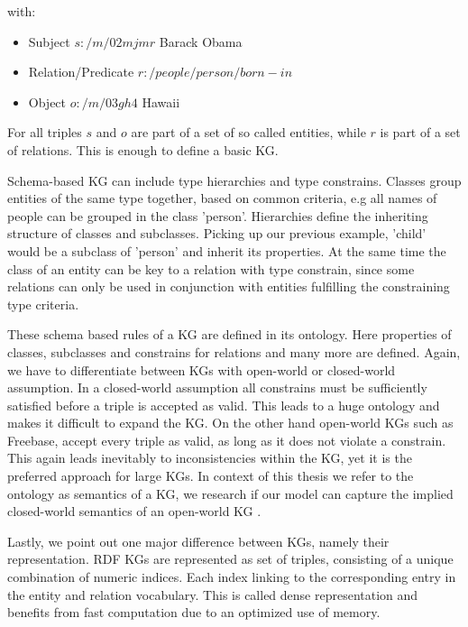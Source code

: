 with:
\begin{itemize}
    \item Subject $s:   /m/02mjmr$ Barack Obama
    \item Relation/Predicate $r:    /people/person/born-in$
    \item Object $o:     /m/03gh4$ Hawaii
\end{itemize}


For all triples $s$ and $o$ are part of a set of so called entities, while $r$ is part of a set of relations. This is enough to define a basic KG.

Schema-based KG can include type hierarchies and type constrains. Classes group entities of the same type together, based on common criteria, e.g all names of people can be grouped in the class 'person'. Hierarchies define the inheriting structure of classes and subclasses. Picking up our previous example, 'child' would be a subclass of 'person' and inherit its properties. At the same time the class of an entity can be key to a relation with type constrain, since some relations can only be used in conjunction with entities fulfilling the constraining type criteria.

These schema based rules of a KG are defined in its ontology. Here properties of classes, subclasses and constrains for relations and many more are defined. Again, we have to differentiate between KGs with open-world or closed-world assumption. In a closed-world assumption all constrains must be sufficiently satisfied before a triple is accepted as valid. This leads to a huge ontology and makes it difficult to expand the KG. On the other hand open-world KGs such as Freebase, accept every triple as valid, as long as it does not violate a constrain. This again leads inevitably to inconsistencies within the KG, yet it is the preferred approach for large KGs. In context of this thesis we refer to the ontology as semantics of a KG, we research if our model can capture the implied closed-world semantics of an open-world KG \cite{nickel_review_2016}.

Lastly, we point out one major difference between KGs, namely their representation. RDF KGs are represented as set of triples, consisting of a unique combination of numeric indices. Each index linking to the corresponding entry in the entity and relation vocabulary. This is called dense representation and benefits from fast computation due to an optimized use of memory.

